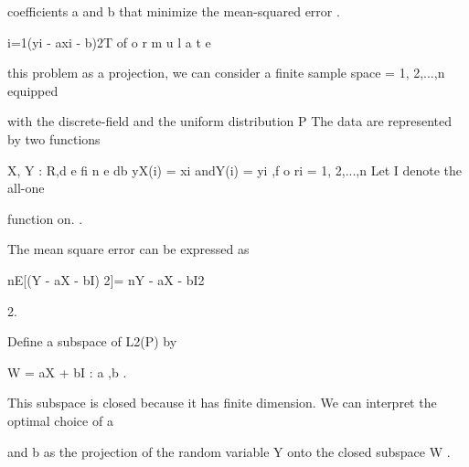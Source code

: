 coefficients a and b that minimize the mean-squared error .

\sumn

i=1(yi - axi - b)2T of o r m u l a t e

this problem as a projection, we can consider a finite sample space \Omega ={ 1, 2,...,n } equipped

with the discrete\sigma-field and the uniform distribution P The data are represented by two functions

X, Y : \Omega \to R,d e fi n e db yX(i) = xi andY(i) = yi ,f o ri = 1, 2,...,n Let I denote the all-one

function on. \Omega .

The mean square error can be expressed as

nE[(Y - aX - bI) 2]= nY - aX - bI2

2.

Define a subspace of L2(P) by

W ={ aX + bI : a \inR,b \inR}.

This subspace is closed because it has finite dimension. We can interpret the optimal choice of a

and b as the projection of the random variable Y onto the closed subspace W .
